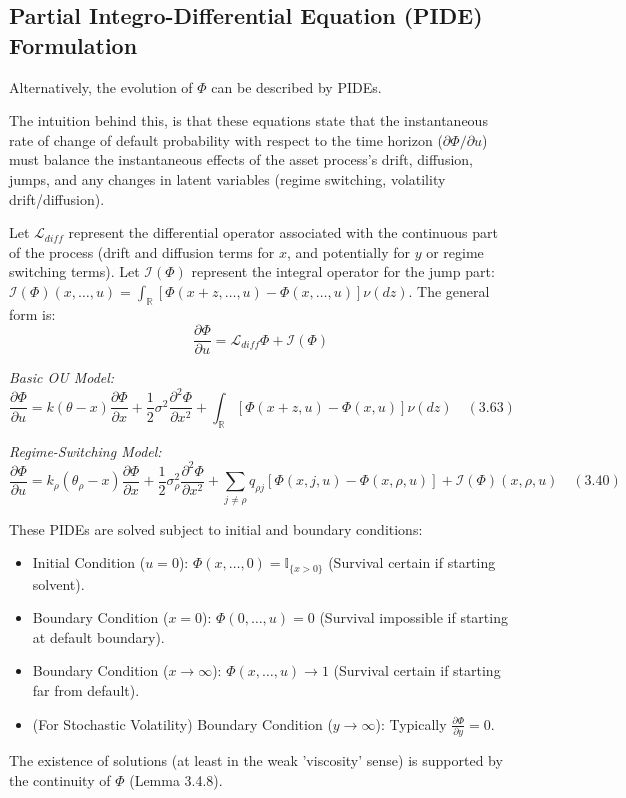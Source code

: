 \documentclass[11pt,twoside,openright]{report}
\begin{document}
\subsection{Partial Integro-Differential Equation (PIDE) Formulation}

Alternatively, the evolution of $\Phi$ can be described by PIDEs.

The intuition behind this, is that these equations state that the instantaneous rate of change of default probability with respect to the time horizon ($\partial \Phi / \partial u$) must balance the instantaneous effects of the asset process's drift, diffusion, jumps, and any changes in latent variables (regime switching, volatility drift/diffusion).

Let $\mathcal{L}_{diff}$ represent the differential operator associated with the continuous part of the process (drift and diffusion terms for $x$, and potentially for $y$ or regime switching terms). Let $\mathcal{I}(\Phi)$ represent the integral operator for the jump part: $\mathcal{I}(\Phi)(x, \dots, u) = \int_{\mathbb{R}} [\Phi(x+z, \dots, u) - \Phi(x, \dots, u)] \nu(dz)$. The general form is:
$$ \frac{\partial \Phi}{\partial u} = \mathcal{L}_{diff}\Phi + \mathcal{I}(\Phi) $$

\textit{Basic OU Model:}
$$ \frac{\partial \Phi}{\partial u} = k(\theta - x)\frac{\partial \Phi}{\partial x} + \frac{1}{2}\sigma^2 \frac{\partial^2 \Phi}{\partial x^2} + \int_{\mathbb{R}} [\Phi(x+z, u) - \Phi(x, u)] \nu(dz) \quad (3.63) $$


\textit{Regime-Switching Model:}
$$ \frac{\partial \Phi}{\partial u} = k_{\rho}(\theta_{\rho} - x)\frac{\partial \Phi}{\partial x} + \frac{1}{2}\sigma_{\rho}^2 \frac{\partial^2 \Phi}{\partial x^2} + \sum_{j \neq \rho} q_{\rho j} [\Phi(x, j, u) - \Phi(x, \rho, u)] + \mathcal{I}(\Phi)(x, \rho, u) \quad (3.40) $$




These PIDEs are solved subject to initial and boundary conditions:
\begin{itemize}
    \item Initial Condition ($u=0$): $\Phi(x, \dots, 0) = \mathbb{I}_{\{x>0\}}$ (Survival certain if starting solvent).
    \item Boundary Condition ($x=0$): $\Phi(0, \dots, u) = 0$ (Survival impossible if starting at default boundary).
    \item Boundary Condition ($x \to \infty$): $\Phi(x, \dots, u) \to 1$ (Survival certain if starting far from default).
    \item (For Stochastic Volatility) Boundary Condition ($y \to \infty$): Typically $\frac{\partial \Phi}{\partial y} = 0$.
\end{itemize}
The existence of solutions (at least in the weak 'viscosity' sense) is supported by the continuity of $\Phi$ (Lemma 3.4.8).
\end{document}
